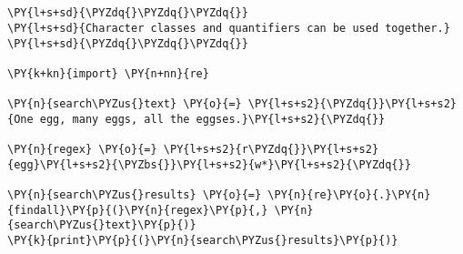 

\section*{}

\begin{Verbatim}[commandchars=\\\{\}]
\PY{l+s+sd}{\PYZdq{}\PYZdq{}\PYZdq{}}
\PY{l+s+sd}{Character classes and quantifiers can be used together.}
\PY{l+s+sd}{\PYZdq{}\PYZdq{}\PYZdq{}}

\PY{k+kn}{import} \PY{n+nn}{re}

\PY{n}{search\PYZus{}text} \PY{o}{=} \PY{l+s+s2}{\PYZdq{}}\PY{l+s+s2}{One egg, many eggs, all the eggses.}\PY{l+s+s2}{\PYZdq{}}

\PY{n}{regex} \PY{o}{=} \PY{l+s+s2}{r\PYZdq{}}\PY{l+s+s2}{egg}\PY{l+s+s2}{\PYZbs{}}\PY{l+s+s2}{w*}\PY{l+s+s2}{\PYZdq{}}

\PY{n}{search\PYZus{}results} \PY{o}{=} \PY{n}{re}\PY{o}{.}\PY{n}{findall}\PY{p}{(}\PY{n}{regex}\PY{p}{,} \PY{n}{search\PYZus{}text}\PY{p}{)}
\PY{k}{print}\PY{p}{(}\PY{n}{search\PYZus{}results}\PY{p}{)}
\end{Verbatim}
